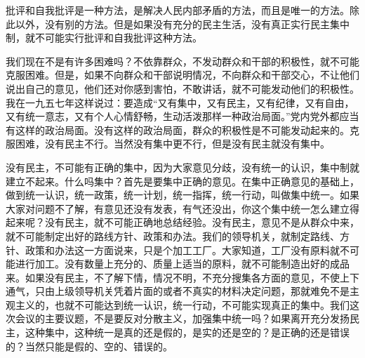 批评和自我批评是一种方法，是解决人民内部矛盾的方法，而且是唯一的方法。除此以外，没有别的方法。但是如果没有充分的民主生活，没有真正实行民主集中制，就不可能实行批评和自我批评这种方法。

我们现在不是有许多困难吗？不依靠群众，不发动群众和干部的积极性，就不可能克服困难。但是，如果不向群众和干部说明情况，不向群众和干部交心，不让他们说出自己的意见，他们还对你感到害怕，不敢讲话，就不可能发动他们的积极性。我在一九五七年这样说过：要造成“又有集中，又有民主，又有纪律，又有自由，又有统一意志，又有个人心情舒畅，生动活泼那样一种政治局面。”党内党外都应当有这样的政治局面。没有这样的政治局面，群众的积极性是不可能发动起来的。克服困难，没有民主不行。当然没有集中更不行，但是没有民主就没有集中。

没有民主，不可能有正确的集中，因为大家意见分歧，没有统一的认识，集中制就建立不起来。什么吗集中？首先是要集中正确的意见。在集中正确意见的基础上，做到统一认识，统一政策，统一计划，统一指挥，统一行动，叫做集中统一。如果大家对问题不了解，有意见还没有发表，有气还没出，你这个集中统一怎么建立得起来呢？没有民主，就不可能正确地总结经验。没有民主，意见不是从群众中来，就不可能制定出好的路线方针、政策和办法。我们的领导机关，就制定路线、方针、政策和办法这一方面说来，只是个加工工厂。大家知道，工厂没有原料就不可能进行加工。没有数量上充分的、质量上适当的原料，就不可能制造出好的成品来。如果没有民主，不了解下情，情况不明，不充分搜集各方面的意见，不使上下通气，只由上级领导机关凭着片面的或者不真实的材料决定问题，那就难免不是主观主义的，也就不可能达到统一认识，统一行动，不可能实现真正的集中。我们这次会议的主要议题，不是要反对分散主义，加强集中统一吗？如果离开充分发扬民主，这种集中，这种统一是真的还是假的，是实的还是空的？是正确的还是错误的？当然只能是假的、空的、错误的。

